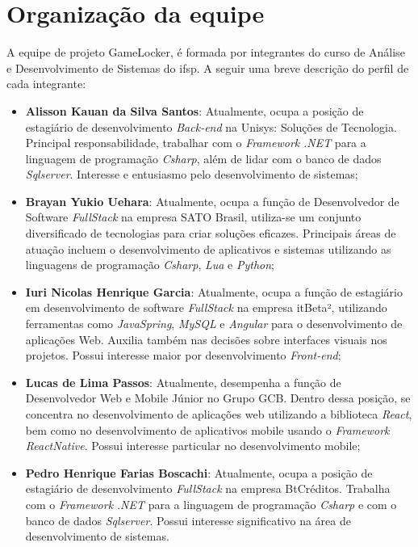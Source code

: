 \section{Organização da equipe}

A equipe de projeto GameLocker, é formada por integrantes do curso de Análise e Desenvolvimento de Sistemas do \ac{ifsp}. A seguir uma breve descrição do perfil de cada integrante:

\begin{itemize}

\item \textbf{Alisson Kauan da Silva Santos}: Atualmente, ocupa a posição de estagiário de desenvolvimento \textit{\gls{Back-end}} na Unisys: Soluções de Tecnologia. Principal responsabilidade, trabalhar com o \textit{\gls{Framework}} \textit{\gls{.NET}} para a linguagem de programação \textit{\gls{Csharp}}, além de lidar com o banco de dados \textit{\gls{Sqlserver}}. Interesse e entusiasmo pelo desenvolvimento de sistemas;

\item \textbf{Brayan Yukio Uehara}: Atualmente, ocupa a função de Desenvolvedor de Software \textit{\gls{FullStack}} na empresa SATO Brasil, utiliza-se um conjunto diversificado de tecnologias para criar soluções eficazes. Principais áreas de atuação incluem o desenvolvimento de aplicativos e sistemas utilizando as linguagens de programação \textit{\gls{Csharp}}, \textit{\gls{Lua}} e \textit{\gls{Python}};

\item \textbf{Iuri Nicolas Henrique Garcia}: Atualmente, ocupa a função de estagiário em desenvolvimento de software \textit{\gls{FullStack}} na empresa itBeta², utilizando ferramentas como \textit{\gls{JavaSpring}}, \textit{\gls{MySQL}} e \textit{\gls{Angular}} para o desenvolvimento de aplicações Web. Auxilia também nas decisões sobre interfaces visuais nos projetos. Possui interesse maior por desenvolvimento \textit{\gls{Front-end}};

\item \textbf{Lucas de Lima Passos}: Atualmente, desempenha a função de Desenvolvedor Web e Mobile Júnior no Grupo GCB. Dentro dessa posição, se concentra no desenvolvimento de aplicações web utilizando a biblioteca \textit{\gls{React}}, bem como no desenvolvimento de aplicativos mobile usando o \textit{\gls{Framework}} \textit{\gls{ReactNative}}. Possui interesse particular no desenvolvimento mobile;

\item \textbf{Pedro Henrique Farias Boscachi}: Atualmente, ocupa a posição de estagiário de desenvolvimento \textit{\gls{FullStack}} na empresa BtCréditos. Trabalha com o \textit{\gls{Framework}} \textit{\gls{.NET}} para a linguagem de programação \textit{\gls{Csharp}} e com o banco de dados \textit{\gls{Sqlserver}}. Possui interesse significativo na área de desenvolvimento de sistemas.


\end{itemize}
